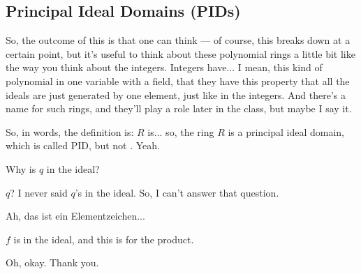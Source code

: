 \subsection{Principal Ideal Domains (PIDs)}

\begin{speech}[00:36:27 - 00:37:20]
So, the outcome of this is that one can think --- of course, this breaks down at a certain point, but it's useful to think about these polynomial rings a little bit like the way you think about the integers. Integers have... I mean, this kind of polynomial in one variable with a field, that they have this property that all the ideals are just generated by one element, just like in the integers. And there's a name for such rings, and they'll play a role later in the class, but maybe I say it.

So, in words, the definition is: $R$ is... so, the ring $R$ is a principal ideal domain, which is called PID, but not . Yeah.
\end{speech}

\begin{student}
Why is $q$ in the ideal?
\end{student}

\begin{speech}[00:37:24 - 00:37:30]
$q$? I never said $q$'s in the ideal. So, I can't answer that question.
\end{speech}

\begin{student}
Ah, das ist ein Elementzeichen... 
\end{student}

\begin{speech}[00:37:34 - 00:37:39]
$f$ is in the ideal, and this is for the product.
\end{speech}

\begin{student}
Oh, okay. Thank you.
\end{student}

